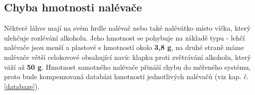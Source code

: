 \subsection{Chyba hmotnosti nalévače}
Některé láhve mají na svém hrdle nalévač nebo také nalévátko místo víčka, který ulehčuje rozlévání alkoholu. Jeho hmotnost se pohybuje na základě typu - lehčí nalévače jsou menší a plastové s hmotností okolo \textbf{3,8 g}, na druhé straně máme nalévače větší celokovové obsahující navíc klapku proti zvětrávání alkoholu, který váží až \textbf{50 g}. Hmotnost samotného nalévače přináší chybu do měřeného systému, proto bude kompenzovaná databázi hmotností jednotlivých nalévačů (viz kap. č. \ref{databaze}). %


